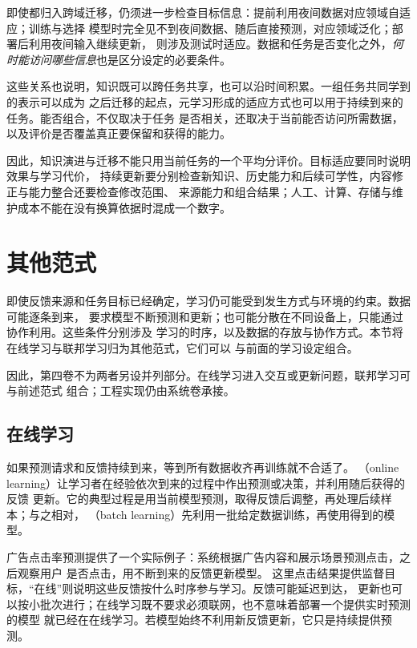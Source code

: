即使都归入跨域迁移，仍须进一步检查目标信息：提前利用夜间数据对应领域自适应；训练与选择
模型时完全见不到夜间数据、随后直接预测，对应领域泛化；部署后利用夜间输入继续更新，
则涉及测试时适应。数据和任务是否变化之外，\emph{何时能访问哪些信息}也是区分设定的必要条件。

这些关系也说明，知识既可以跨任务共享，也可以沿时间积累。一组任务共同学到的表示可以成为
之后迁移的起点，元学习形成的适应方式也可以用于持续到来的任务。能否组合，不仅取决于任务
是否相关，还取决于当前能否访问所需数据，以及评价是否覆盖真正要保留和获得的能力。

因此，知识演进与迁移不能只用当前任务的一个平均分评价。目标适应要同时说明效果与学习代价，
持续更新要分别检查新知识、历史能力和后续可学性，内容修正与能力整合还要检查修改范围、
来源能力和组合结果；人工、计算、存储与维护成本不能在没有换算依据时混成一个数字。

\section{其他范式}
\label{sec:other-learning-settings}

即使反馈来源和任务目标已经确定，学习仍可能受到发生方式与环境的约束。数据可能逐条到来，
要求模型不断预测和更新；也可能分散在不同设备上，只能通过协作利用。这些条件分别涉及
学习的时序，以及数据的存放与协作方式。本节将在线学习与联邦学习归为其他范式，它们可以
与前面的学习设定组合。

因此，第四卷不为两者另设并列部分。在线学习进入交互或更新问题，联邦学习可与前述范式
组合；工程实现仍由系统卷承接。

\subsection{在线学习}
\label{sec:online-learning}

如果预测请求和反馈持续到来，等到所有数据收齐再训练就不合适了。
（online learning）让学习者在经验依次到来的过程中作出预测或决策，并利用随后获得的反馈
更新。它的典型过程是用当前模型预测，取得反馈后调整，再处理后续样本；与之相对，
（batch learning）先利用一批给定数据训练，再使用得到的模型。

广告点击率预测提供了一个实际例子：系统根据广告内容和展示场景预测点击，之后观察用户
是否点击，用不断到来的反馈更新模型。
这里点击结果提供监督目标，“在线”则说明这些反馈按什么时序参与学习。反馈可能延迟到达，
更新也可以按小批次进行；在线学习既不要求必须联网，也不意味着部署一个提供实时预测的模型
就已经在在线学习。若模型始终不利用新反馈更新，它只是持续提供预测。

